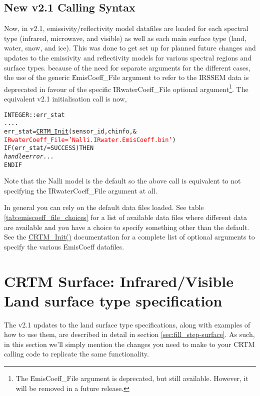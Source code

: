 \subsection{New v2.1 Calling Syntax}
Now, in v2.1, emissivity/reflectivity model datafiles are loaded for each spectral type (infrared, microwave, and visible) as well as each main surface type (land, water, snow, and ice). This was done to get set up for planned future changes and updates to the emissivity and reflectivity models for various spectral regions and surface types. because of the need for separate arguments for the different cases, the use of the generic \f{EmisCoeff\_File} argument to refer to the IRSSEM data is deprecated in favour of the specific \f{IRwaterCoeff\_File} optional argument\footnote{The \f{EmisCoeff\_File} argument is deprecated, but still available. However, it will be removed in a future release.}. The equivalent v2.1 initialisation call is now,

\begin{alltt}
  INTEGER :: err_stat
  ....
  err_stat = \hyperref[sec:CRTM_Init_interface]{CRTM_Init}( sensor_id, chinfo, &
                        \textcolor{red}{IRwaterCoeff_File = 'Nalli.IRwater.EmisCoeff.bin'} )
  IF ( err_stat /= SUCCESS ) THEN
    \textrm{\textit{handle error...}}
  END IF\end{alltt}

Note that the Nalli model is the default so the above call is equivalent to not specifying the \f{IRwaterCoeff\_File} argument at all.

In general you can rely on the default data files loaded. See table \ref{tab:emiscoeff_file_choices} for a list of available data files where different data are available and you have a choice to specify something other than the default. See the \hyperref[sec:CRTM_Init_interface]{\f{CRTM\_Init()}} documentation for a complete list of optional arguments to specify the various \f{EmisCoeff} datafiles.


\section{CRTM Surface: Infrared/Visible Land surface type specification}
The v2.1 updates to the land surface type specifications, along with examples of how to use them, are described in detail in section \ref{sec:fill_step-surface}. As such, in this section we'll simply mention the changes you need to make to your CRTM calling code to replicate the same functionality.



